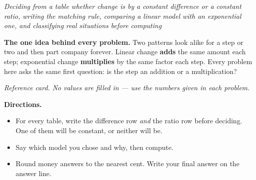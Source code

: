 \documentclass[12pt]{article}
\begin{document}

\begin{center}
\textit{Deciding from a table whether change is by a constant difference or a
constant ratio, writing the matching rule, comparing a linear model with an
exponential one, and classifying real situations before computing}
\end{center}

\noindent\textbf{The one idea behind every problem.} Two patterns look alike for
a step or two and then part company forever. Linear change \textbf{adds} the
same amount each step; exponential change \textbf{multiplies} by the same factor
each step. Every problem here asks the same first question: is the step an
addition or a multiplication?

\begin{center}

\smallskip
\small\textit{Reference card. No values are filled in --- use the numbers given
in each problem.}\normalsize
\end{center}

\noindent\textbf{Directions.}
\begin{itemize}[leftmargin=1.2cm, itemsep=2pt, topsep=2pt]
\item For every table, write the difference row \emph{and} the ratio row before
deciding. One of them will be constant, or neither will be.
\item Say which model you chose and why, then compute.
\item Round money answers to the nearest cent. Write your final answer on the
answer line.
\end{itemize}

\end{document}
